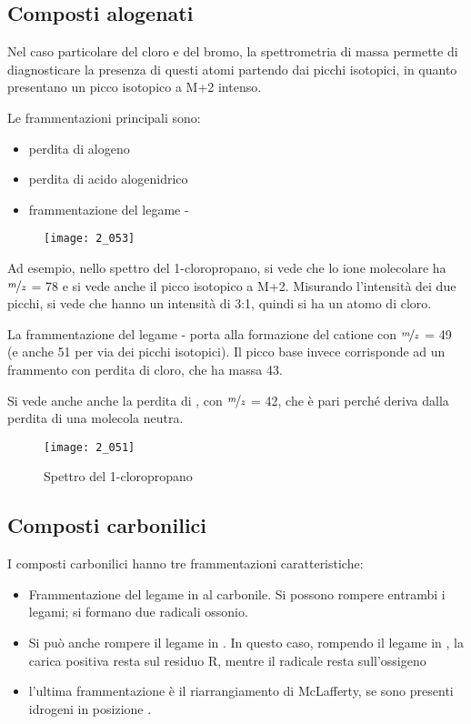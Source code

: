 \subsection{Composti alogenati}

Nel caso particolare del cloro e del bromo, la spettrometria di massa
permette di diagnosticare la presenza di questi atomi partendo dai
picchi isotopici, in quanto presentano un picco isotopico a M+2 intenso.

Le frammentazioni principali sono:
\begin{itemize}
  \item perdita di alogeno
  \item perdita di acido alogenidrico 
  \item frammentazione del legame \alpha-\beta{}
\end{itemize}

\begin{figure}[H]
  \texttt{[image: 2\_053]}
\end{figure}

Ad esempio, nello spettro del 1-cloropropano, si vede che lo ione
molecolare ha $\nicefrac{m}{z}$ = 78 e si vede anche il picco isotopico a M+2.
Misurando l'intensità dei due picchi, si vede che hanno un intensità di
3:1, quindi si ha un atomo di cloro.

La frammentazione del legame \alpha-\beta{} porta alla formazione del
catione con $\nicefrac{m}{z}$ = 49 (e anche 51 per via dei picchi isotopici). Il picco
base invece corrisponde ad un frammento con perdita di cloro, che ha
massa 43.

Si vede anche anche la perdita di , con $\nicefrac{m}{z}$ = 42, che è pari
perché deriva dalla perdita di una molecola neutra.

\begin{figure}[H]
  \texttt{[image: 2\_051]}
  \caption{Spettro del 1-cloropropano}
\end{figure}

\vfill
\pagebreak

\subsection{Composti carbonilici}

I composti carbonilici hanno tre frammentazioni caratteristiche:
\begin{itemize}
  \item Frammentazione del legame in \alpha{} al carbonile. 
  Si possono rompere entrambi i legami; si formano due radicali ossonio.
  \item Si può anche rompere il legame in \beta.
  In questo caso, rompendo il legame in \beta,
  la carica positiva resta sul residuo R, mentre il radicale resta
  sull'ossigeno
  \item l'ultima frammentazione è il riarrangiamento di
  McLafferty, se sono presenti idrogeni in posizione \gamma.
\end{itemize}

